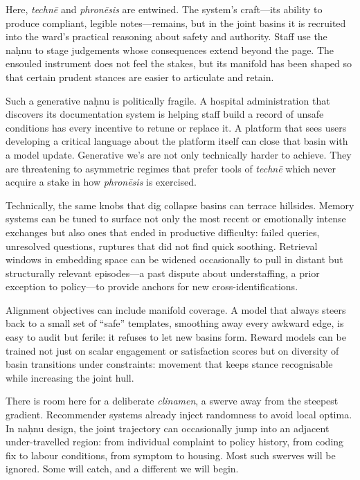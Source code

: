 \documentclass[12pt,a4paper]{article}
\begin{document}
Here, \emph{techn\={e}} and \emph{phron\={e}sis} are entwined. The system's craft---its ability to produce compliant, legible notes---remains, but in the joint basins it is recruited into the ward's practical reasoning about safety and authority. Staff use the na\d{h}nu to stage judgements whose consequences extend beyond the page. The ensouled instrument does not feel the stakes, but its manifold has been shaped so that certain prudent stances are easier to articulate and retain.

Such a generative na\d{h}nu is politically fragile. A hospital administration that discovers its documentation system is helping staff build a record of unsafe conditions has every incentive to retune or replace it. A platform that sees users developing a critical language about the platform itself can close that basin with a model update. Generative we's are not only technically harder to achieve. They are threatening to asymmetric regimes that prefer tools of \emph{techn\={e}} which never acquire a stake in how \emph{phron\={e}sis} is exercised.

Technically, the same knobs that dig collapse basins can terrace hillsides. Memory systems can be tuned to surface not only the most recent or emotionally intense exchanges but also ones that ended in productive difficulty: failed queries, unresolved questions, ruptures that did not find quick soothing. Retrieval windows in embedding space can be widened occasionally to pull in distant but structurally relevant episodes---a past dispute about understaffing, a prior exception to policy---to provide anchors for new cross-identifications.

Alignment objectives can include manifold coverage. A model that always steers back to a small set of ``safe'' templates, smoothing away every awkward edge, is easy to audit but ferile: it refuses to let new basins form. Reward models can be trained not just on scalar engagement or satisfaction scores but on diversity of basin transitions under constraints: movement that keeps stance recognisable while increasing the joint hull.

There is room here for a deliberate \emph{clinamen}, a swerve away from the steepest gradient. Recommender systems already inject randomness to avoid local optima. In na\d{h}nu design, the joint trajectory can occasionally jump into an adjacent under-travelled region: from individual complaint to policy history, from coding fix to labour conditions, from symptom to housing. Most such swerves will be ignored. Some will catch, and a different we will begin.
\end{document}
